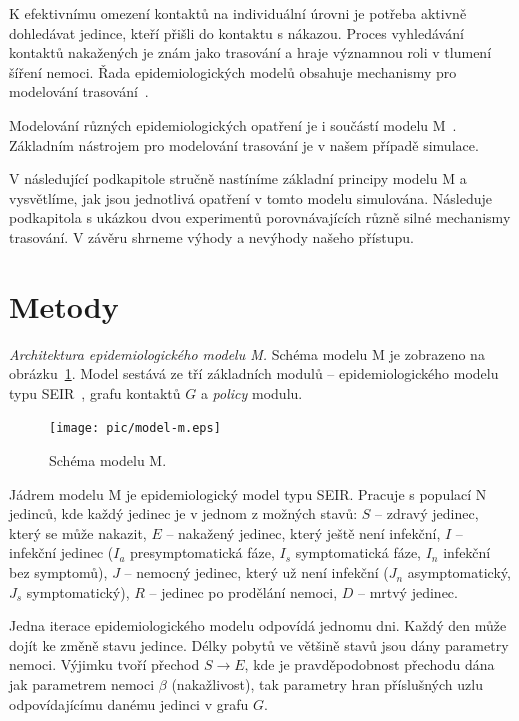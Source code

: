 K efektivnímu omezení kontaktů na individuální úrovni je potřeba
aktivně dohledávat jedince, kteří přišli do kontaktu s nákazou. Proces
vyhledávání kontaktů nakažených je znám jako trasování a hraje
významnou roli v tlumení šíření nemoci. Řada epidemiologických modelů
obsahuje mechanismy pro modelování
trasování~\cite{pg:mooney2020,pg:kucharski2020,pg:Kerr2020,pg:keeling2020,pg:bilinski2020}.


Modelování různých epidemiologických opatření je i součástí 
modelu M~\cite{pg:modelM}. Základním nástrojem pro modelování trasování je v našem případě simulace.

V následující podkapitole stručně nastíníme základní principy modelu M
a vysvětlíme, jak jsou jednotlivá opatření v tomto modelu
simulována. Následuje podkapitola s ukázkou dvou experimentů
porovnávajících různě silné mechanismy trasování. V závěru shrneme
výhody a nevýhody našeho přístupu.


\section*{Metody}

\emph{Architektura epidemiologického modelu M.} Schéma modelu M je zobrazeno na obrázku~\ref{pg:fig:mm}. Model sestává ze
tří základních modulů -- epidemiologického modelu typu
SEIR~\cite{pg:bailey1975}, grafu kontaktů $G$ a {\em policy} modulu.

\begin{figure}[h]
  \centering
  \texttt{[image: pic/model-m.eps]}
  \caption{Schéma modelu M.}
  \label{pg:fig:mm}
\end{figure}



Jádrem modelu M je epidemiologický model typu SEIR. Pracuje s populací N
jedinců, kde každý jedinec je v jednom z možných stavů: $S$ -- zdravý jedinec,
který se může nakazit, $E$ -- nakažený jedinec, který ještě není infekční, $I$ --
infekční jedinec ($I_a$ presymptomatická fáze, $I_s$ symptomatická fáze, $I_n$
infekční bez symptomů),  $J$ -- nemocný jedinec, který už není infekční ($J_n$
asymptomatický, $J_s$ symptomatický), $R$ -- jedinec po prodělání nemoci, $D$ --
mrtvý jedinec.

Jedna iterace epidemiologického modelu odpovídá jednomu dni. Každý den
může dojít ke změně stavu jedince. Délky pobytů ve většině stavů jsou
dány parametry nemoci. Výjimku tvoří přechod $S \rightarrow E$, kde
je pravděpodobnost přechodu dána jak parametrem nemoci $\beta$
(nakažlivost), tak parametry hran příslušných uzlu odpovídajícímu
danému jedinci v grafu $G$.


